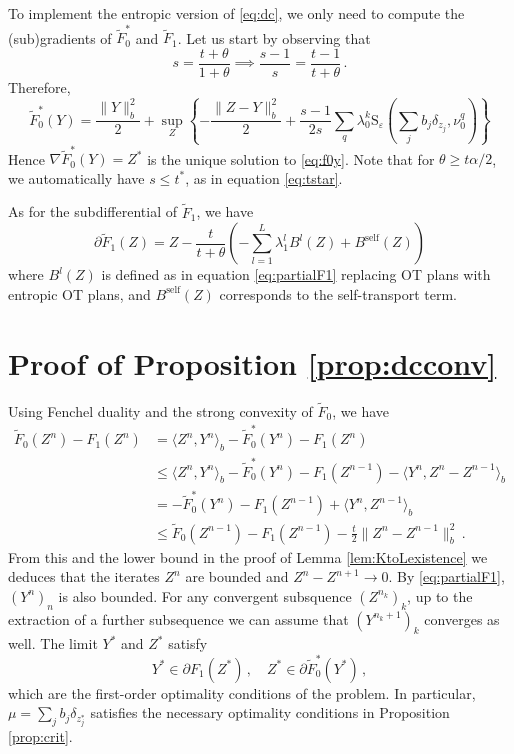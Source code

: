 \documentclass[12pt]{amsart}
\numberwithin{equation}{section}
\let\mr=\mathrm
\theoremstyle{plain}
\theoremstyle{definition}
\begin{document}
To implement the entropic version of \eqref{eq:dc}, we only need to compute the (sub)gradients of $\tilde{F}^*_0$ and $\tilde{F}_1$.
Let us start by observing that 
$$
s = \frac{t+\theta}{1+\theta} \implies \frac{s-1}{s} = \frac{t-1}{t+\theta}\,.
$$
Therefore, 
\begin{equation}\label{eq:f0y}
    \tilde{F}^*_0(Y) = \frac{\|Y\|^2_b}{2} + \sup_Z \left\{-\frac{\|Z -Y\|^2_b}{2} +\frac{s-1}{2s} \sum_{q} \lambda_0^k \mr{S}_\varepsilon \left( \sum_j b_j \delta_{z_j} , \nu_0^q\right) \right\}
\end{equation}
Hence $\nabla \tilde{F}^*_0(Y)= Z^*$ is the unique solution to \eqref{eq:f0y}. Note that for $\theta \geq t \alpha/2$, we automatically have $s \leq t^*$, as in equation \eqref{eq:tstar}.

As for the subdifferential of $\tilde{F}_1$, we have
$$
\partial \tilde{F}_1(Z) = Z  - \frac{t}{t+\theta} \left( -\sum_{l=1}^L \lambda_1^l B^l(Z) + B^{\mathrm{self}}(Z)\right) $$
where $B^l(Z)$ is defined as in equation \eqref{eq:partialF1} replacing OT plans with entropic OT plans, and  $B^{\mathrm{self}}(Z)$ corresponds to the self-transport term.

\section{Proof of Proposition \ref{prop:dcconv}} \label{app:conv}

Using Fenchel duality and the strong convexity of $\tilde{F}_0$, we have
\[
\begin{aligned}
\tilde{F}_0(Z^n) -F_1(Z^n) &=  \langle Z^n,Y^n\rangle_b -\tilde{F}^*_0(Y^n) - F_1(Z^n) \\&\leq \langle Z^n,Y^n\rangle_b -\tilde{F}^*_0(Y^n) - F_1(Z^{n-1}) - \langle Y^n, Z^n - Z^{n-1}\rangle_b \\ &=  -\tilde{F}_0^*(Y^n) - F_1(Z^{n-1}) + \langle Y^n, Z^{n-1}\rangle_b \\ 
& \leq \tilde{F}_0(Z^{n-1})- F_1(Z^{n-1}) - \frac{t}{2}\|Z^n-Z^{n-1}\|^2_b\,.
\end{aligned}
\]
From this and the lower bound in the proof of Lemma \ref{lem:KtoLexistence} we deduces that the iterates $Z^n$ are bounded and $Z^n -Z^{n+1} \rightarrow 0$. By \eqref{eq:partialF1}, $(Y^n)_n$ is also bounded. For any convergent subsquence $(Z^{n_k})_k$, up to the extraction of a further subsequence we can assume that $(Y^{n_k+1})_k$ converges as well. The limit $Y^*$ and $Z^*$ satisfy
\[
Y^* \in \partial F_1(Z^*) \,, \quad Z^* \in \partial \tilde{F}_0^*(Y^*)\,,
\]
which are the first-order optimality conditions of the problem. In particular, $\mu = \sum_j b_j \delta_{z_j^*}$ satisfies the necessary optimality conditions in Proposition \ref{prop:crit}.
\end{document}
